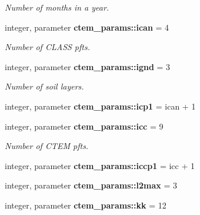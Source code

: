 \begin{DoxyCompactItemize}
\begin{DoxyCompactList}\small\item\em Number of months in a year. \end{DoxyCompactList}\item 
\hypertarget{namespacectem__params_af834d482b4eec80d530f6f6afc9fc5b5}{}integer, parameter {\bfseries ctem\+\_\+params\+::ican} = 4\label{namespacectem__params_af834d482b4eec80d530f6f6afc9fc5b5}

\begin{DoxyCompactList}\small\item\em Number of C\+L\+A\+S\+S pfts. \end{DoxyCompactList}\item 
\hypertarget{namespacectem__params_aa84174d70bc4dcedb2b6edeb859f1507}{}integer, parameter {\bfseries ctem\+\_\+params\+::ignd} = 3\label{namespacectem__params_aa84174d70bc4dcedb2b6edeb859f1507}

\begin{DoxyCompactList}\small\item\em Number of soil layers. \end{DoxyCompactList}\item 
\hypertarget{namespacectem__params_a8b61932a368c557cc3cb7edf6de23e22}{}integer, parameter {\bfseries ctem\+\_\+params\+::icp1} = ican + 1\label{namespacectem__params_a8b61932a368c557cc3cb7edf6de23e22}

\item 
\hypertarget{namespacectem__params_afa448c586accb0aa6dade1df419eb2fd}{}integer, parameter {\bfseries ctem\+\_\+params\+::icc} = 9\label{namespacectem__params_afa448c586accb0aa6dade1df419eb2fd}

\begin{DoxyCompactList}\small\item\em Number of C\+T\+E\+M pfts. \end{DoxyCompactList}\item 
\hypertarget{namespacectem__params_a1da4b2c80e21cf1adf10e9c7ee9a2189}{}integer, parameter {\bfseries ctem\+\_\+params\+::iccp1} = icc + 1\label{namespacectem__params_a1da4b2c80e21cf1adf10e9c7ee9a2189}

\item 
\hypertarget{namespacectem__params_af57395876febe85e76b0403ab6a4e8ed}{}integer, parameter {\bfseries ctem\+\_\+params\+::l2max} = 3\label{namespacectem__params_af57395876febe85e76b0403ab6a4e8ed}

\item 
\hypertarget{namespacectem__params_a4b2eab1c298364048680641681921e56}{}integer, parameter {\bfseries ctem\+\_\+params\+::kk} = 12\label{namespacectem__params_a4b2eab1c298364048680641681921e56}


\end{DoxyCompactItemize}
